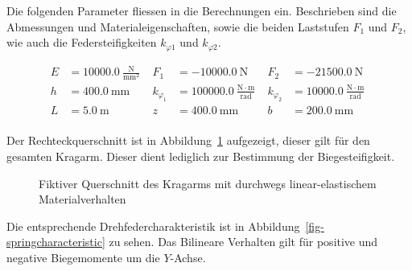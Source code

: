 \documentclass[
  11pt,
  letterpaper,
]{scrreprt}
\begin{document}
Die folgenden Parameter fliessen in die Berechnungen ein. Beschrieben
sind die Abmessungen und Materialeigenschaften, sowie die beiden
Laststufen \(F_1\) und \(F_2\), wie auch die Federsteifigkeiten
\(k_{\varphi1}\) und \(k_{\varphi2}\).

$$
\begin{aligned}
E &= 10000.0\ \frac{\mathrm{N}}{\mathrm{mm}^{2}} \; 
 &F_{1} &= -10000.0\ \mathrm{N} \; 
 &F_{2} &= -21500.0\ \mathrm{N} \; 
\\[12pt]
 h &= 400.0\ \mathrm{mm} \; 
 &k_{\varphi_{1}} &= 100000.0\ \frac{\mathrm{N} \cdot \mathrm{m}}{\mathrm{rad}} \; 
 &k_{\varphi_{2}} &= 10000.0\ \frac{\mathrm{N} \cdot \mathrm{m}}{\mathrm{rad}} \; 
\\[12pt]
 L &= 5.0\ \mathrm{m} \; 
 &z &= 400.0\ \mathrm{mm} \; 
 &b &= 200.0\ \mathrm{mm} \; 
\\[12pt]
\end{aligned}
$$

Der Rechteckquerschnitt ist in Abbildung~\ref{fig-qs-kragarm}
aufgezeigt, dieser gilt für den gesamten Kragarm. Dieser dient lediglich
zur Bestimmung der Biegesteifigkeit.

\begin{figure}[H]


\caption{\label{fig-qs-kragarm}Fiktiver Querschnitt des Kragarms mit
durchwegs linear-elastischem Materialverhalten}

\end{figure}%

Die entsprechende Drehfedercharakteristik ist in
Abbildung~\ref{fig-springcharacteristic} zu sehen. Das Bilineare
Verhalten gilt für positive und negative Biegemomente um die
\(Y\)-Achse.
\end{document}
